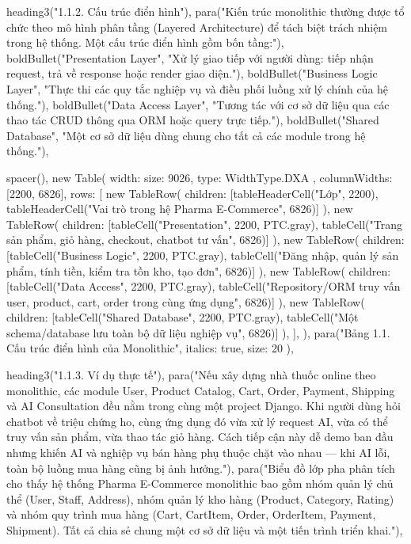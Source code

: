   heading3("1.1.2. Cấu trúc điển hình"),
  para("Kiến trúc monolithic thường được tổ chức theo mô hình phân tầng (Layered Architecture) để tách biệt trách nhiệm trong hệ thống. Một cấu trúc điển hình gồm bốn tầng:"),
  boldBullet("Presentation Layer", "Xử lý giao tiếp với người dùng: tiếp nhận request, trả về response hoặc render giao diện."),
  boldBullet("Business Logic Layer", "Thực thi các quy tắc nghiệp vụ và điều phối luồng xử lý chính của hệ thống."),
  boldBullet("Data Access Layer", "Tương tác với cơ sở dữ liệu qua các thao tác CRUD thông qua ORM hoặc query trực tiếp."),
  boldBullet("Shared Database", "Một cơ sở dữ liệu dùng chung cho tất cả các module trong hệ thống."),

  spacer(),
  new Table({
    width: { size: 9026, type: WidthType.DXA },
    columnWidths: [2200, 6826],
    rows: [
      new TableRow({ children: [tableHeaderCell("Lớp", 2200), tableHeaderCell("Vai trò trong hệ Pharma E-Commerce", 6826)] }),
      new TableRow({ children: [tableCell("Presentation", 2200, PTC.gray), tableCell("Trang sản phẩm, giỏ hàng, checkout, chatbot tư vấn", 6826)] }),
      new TableRow({ children: [tableCell("Business Logic", 2200, PTC.gray), tableCell("Đăng nhập, quản lý sản phẩm, tính tiền, kiểm tra tồn kho, tạo đơn", 6826)] }),
      new TableRow({ children: [tableCell("Data Access", 2200, PTC.gray), tableCell("Repository/ORM truy vấn user, product, cart, order trong cùng ứng dụng", 6826)] }),
      new TableRow({ children: [tableCell("Shared Database", 2200, PTC.gray), tableCell("Một schema/database lưu toàn bộ dữ liệu nghiệp vụ", 6826)] }),
    ],
  }),
  para("Bảng 1.1. Cấu trúc điển hình của Monolithic", { italics: true, size: 20 }),

  heading3("1.1.3. Ví dụ thực tế"),
  para("Nếu xây dựng nhà thuốc online theo monolithic, các module User, Product Catalog, Cart, Order, Payment, Shipping và AI Consultation đều nằm trong cùng một project Django. Khi người dùng hỏi chatbot về triệu chứng ho, cùng ứng dụng đó vừa xử lý request AI, vừa có thể truy vấn sản phẩm, vừa thao tác giỏ hàng. Cách tiếp cận này dễ demo ban đầu nhưng khiến AI và nghiệp vụ bán hàng phụ thuộc chặt vào nhau — khi AI lỗi, toàn bộ luồng mua hàng cũng bị ảnh hưởng."),
  para("Biểu đồ lớp pha phân tích cho thấy hệ thống Pharma E-Commerce monolithic bao gồm nhóm quản lý chủ thể (User, Staff, Address), nhóm quản lý kho hàng (Product, Category, Rating) và nhóm quy trình mua hàng (Cart, CartItem, Order, OrderItem, Payment, Shipment). Tất cả chia sẻ chung một cơ sở dữ liệu và một tiến trình triển khai."),

